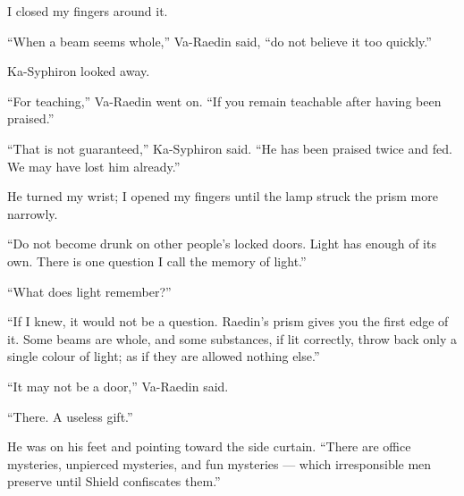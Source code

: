 I closed my fingers around it.\par
``When a beam seems whole,'' Va-Raedin said, ``do not believe it too quickly.''\par
Ka-Syphiron looked away.\par
``For teaching,'' Va-Raedin went on. ``If you remain teachable after having been praised.''\par
``That is not guaranteed,'' Ka-Syphiron said. ``He has been praised twice and fed. We may have lost him already.''\par
He turned my wrist; I opened my fingers until the lamp struck the prism more narrowly.\par

``Do not become drunk on other people's locked doors. Light has enough of its own. There is one question I call the memory of light.''\par
``What does light remember?''\par
``If I knew, it would not be a question. Raedin's prism gives you the first edge of it. Some beams are whole, and some substances, if lit correctly, throw back only a single colour of light; as if they are allowed nothing else.''\par
``It may not be a door,'' Va-Raedin said.\par
``There. A useless gift.''\par
He was on his feet and pointing toward the side curtain. ``There are office mysteries, unpierced mysteries, and fun mysteries --- which irresponsible men preserve until Shield confiscates them.''\par

